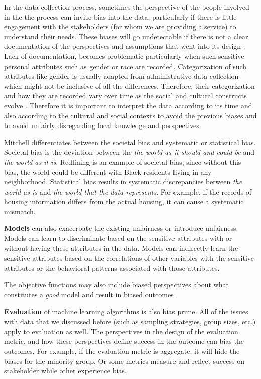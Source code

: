     In the data collection process, sometimes the perspective of the people involved in the the process  can invite bias into the data, particularly if there is little engagement with the stakeholders (for whom we are providing a service) to understand their needs. These biases will go undetectable if there is not a clear documentation of the perspectives and assumptions that went into its design \cite{Hutchinson2021Account}. 
    Lack of documentation, becomes problematic particularly when such sensitive personal attributes such as gender or race are recorded. Categorization of such attributes like gender is usually adapted from administrative data collection which might not be inclusive of all the differences. Therefore, their categorization and how they are recorded vary over time as the social and cultural constructs evolve \cite{Hanna2020CriticalRace}. Therefore it is important to interpret the data according to its time and also according to the cultural and social contexts to avoid the previous biases and to avoid unfairly disregarding local knowledge and perspectives.
    
    Mitchell \cite{mitchell2021algorithmic} differentiates between the societal bias and systematic or statistical bias. Societal bias is the deviation between the \textit{the world as it should and could be} and \textit{the world as it is}. Redlining is an example of societal bias, since without this bias, the world could be different with Black residents living in any neighborhood. Statistical bias results in systematic discrepancies between \textit{the world as is} and \textit{the world that the data represents}. For example, if the records of housing information differs from the actual housing, it can cause a systematic mismatch.
    
    \textbf{Models} can also exacerbate the existing unfairness or introduce unfairness. Models can learn to discriminate based on the sensitive attributes with or without having these attributes in the data. Models can indirectly learn the sensitive attributes based on the correlations of other variables with the sensitive attributes or the behavioral patterns associated with those attributes.
    
    The objective functions may also include biased perspectives about what constitutes a \textit{good} model and result in biased outcomes.
    
    \textbf{Evaluation} of machine learning algorithms is also bias prune. All of the issues with data that we discussed before (such as sampling strategies, group sizes, etc.) apply to evaluation as well. The perspectives in the design of the evaluation metric, and how these perspectives define success in the outcome can bias the outcomes. For example, if the evaluation metric is aggregate, it will hide the biases for the minority group. Or some metrics measure and reflect success on stakeholder while other experience bias. 
    
